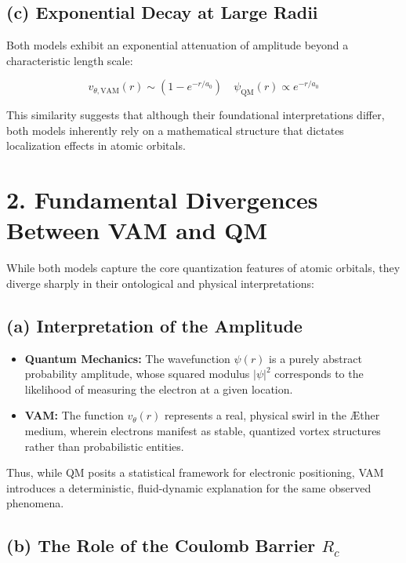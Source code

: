 \subsection*{(c) Exponential Decay at Large Radii}

Both models exhibit an exponential attenuation of amplitude beyond a characteristic length scale:

\[
    v_{\theta, \text{VAM}}(r) \sim \left(1 - e^{-r/a_0}\right) \quad \psi_\text{QM}(r) \propto e^{-r/a_0}
\]

This similarity suggests that although their foundational interpretations differ, both models inherently rely on a mathematical structure that dictates localization effects in atomic orbitals.

\section*{2. Fundamental Divergences Between VAM and QM}

While both models capture the core quantization features of atomic orbitals, they diverge sharply in their ontological and physical interpretations:

\subsection*{(a) Interpretation of the Amplitude}

\begin{itemize}
    \item \textbf{Quantum Mechanics:} The wavefunction \(\psi(r)\) is a purely abstract probability amplitude, whose squared modulus \(|\psi|^2\) corresponds to the likelihood of measuring the electron at a given location.
    \item \textbf{VAM:} The function \(v_{\theta}(r)\) represents a real, physical swirl in the Æther medium, wherein electrons manifest as stable, quantized vortex structures rather than probabilistic entities.
\end{itemize}

Thus, while QM posits a statistical framework for electronic positioning, VAM introduces a deterministic, fluid-dynamic explanation for the same observed phenomena.

\subsection*{(b) The Role of the Coulomb Barrier \(R_c\)}


